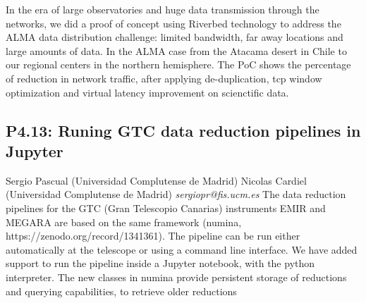 \documentclass{report}
\begin{document}
In the era of large observatories and huge data transmission through the networks, we did a proof of concept using Riverbed technology to address the ALMA data distribution challenge: limited bandwidth, far away locations and large amounts of data.  In the ALMA case from the Atacama desert in Chile to our regional centers in the northern hemisphere.  The PoC shows the percentage of reduction in network traffic, after applying de-duplication, tcp window optimization and virtual latency improvement on scienctific data.\newline
\newpage
\subsection*{P4.13: Runing GTC data reduction pipelines in Jupyter}
\bigskip
Sergio Pascual (Universidad Complutense de Madrid) \newline Nicolas Cardiel (Universidad Complutense de Madrid) \newline   \newline   \newline  \newline  \newline\newline
{\it sergiopr@fis.ucm.es}\newline
\newline\newline
The data reduction pipelines for the GTC (Gran Telescopio Canarias) instruments EMIR and MEGARA are based on the same framework (numina, https://zenodo.org/record/1341361). The pipeline can be run either automatically at the telescope or using a command line interface. We have added support to run the pipeline inside a Jupyter notebook, with the python interpreter. The new classes in numina provide persistent storage of reductions and querying capabilities, to retrieve older reductions\newline
\newpage
\end{document}
